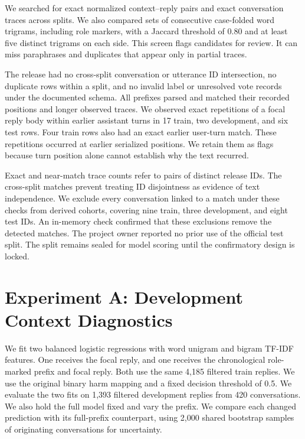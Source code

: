 \documentclass[11pt]{article}
\begin{document}
We searched for exact normalized context--reply pairs and exact conversation traces across splits. We also compared sets of consecutive case-folded word trigrams, including role markers, with a Jaccard threshold of 0.80 and at least five distinct trigrams on each side. This screen flags candidates for review. It can miss paraphrases and duplicates that appear only in partial traces.



The release had no cross-split conversation or utterance ID intersection, no duplicate rows within a split, and no invalid label or unresolved vote records under the documented schema. All prefixes parsed and matched their recorded positions and longer observed traces. We observed exact repetitions of a focal reply body within earlier assistant turns in 17 train, two development, and six test rows. Four train rows also had an exact earlier user-turn match. These repetitions occurred at earlier serialized positions. We retain them as flags because turn position alone cannot establish why the text recurred.

Exact and near-match trace counts refer to pairs of distinct release IDs. The cross-split matches prevent treating ID disjointness as evidence of text independence. We exclude every conversation linked to a match under these checks from derived cohorts, covering nine train, three development, and eight test IDs. An in-memory check confirmed that these exclusions remove the detected matches. The project owner reported no prior use of the official test split. The split remains sealed for model scoring until the confirmatory design is locked.

\section{Experiment A: Development Context Diagnostics}

We fit two balanced logistic regressions with word unigram and bigram TF-IDF features. One receives the focal reply, and one receives the chronological role-marked prefix and focal reply. Both use the same 4,185 filtered train replies. We use the original binary harm mapping and a fixed decision threshold of 0.5. We evaluate the two fits on 1,393 filtered development replies from 420 conversations. We also hold the full model fixed and vary the prefix. We compare each changed prediction with its full-prefix counterpart, using 2,000 shared bootstrap samples of originating conversations for uncertainty.
\end{document}
